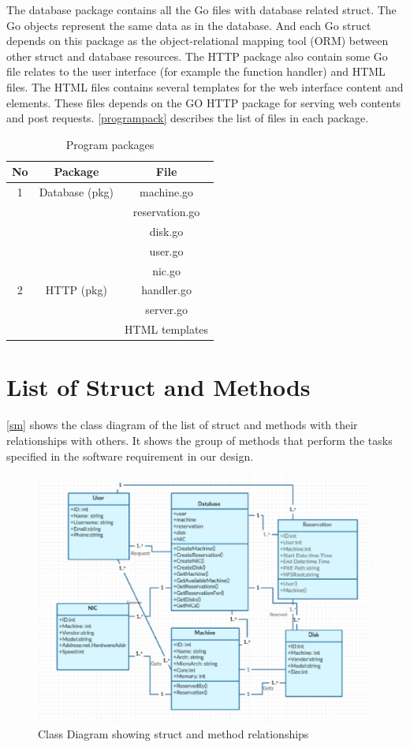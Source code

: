 The database package contains all the Go files with database related struct. The Go objects represent the same data as in the database. And each Go struct depends on this package as the object-relational mapping tool (ORM) between other struct and database resources. The HTTP package also contain some Go file relates to the user interface (for example the function handler) and HTML files. The HTML files contains several templates for the web interface content and elements. These files depends on the GO HTTP package for serving web contents and post requests. \autoref{programpack} describes the list of files in each package.
\pagebreak
\begin{table}[h!]
  \centering
  \begin{tabular}{ccc}
    \hline
    No & Package & File\\
   \hline
    1 &Database (pkg)& machine.go\\
       &&reservation.go\\
      &&disk.go\\
      &&user.go\\
      &&nic.go\\
    \hline
    2 &HTTP (pkg)& handler.go\\
    &&server.go\\
    &&HTML templates\\
    \hline
  \end{tabular}
  \caption{Program packages}
  \label{programpack}
\end{table}

\section{List of Struct and Methods}
\autoref{sm} shows the class diagram of the list of struct and methods with their relationships with others. It shows the group of methods that perform the tasks specified in the software requirement in our design.
\begin{figure}[h!]
\includegraphics[width = \linewidth]{methods.eps}
\caption{Class Diagram showing struct and method relationships}
\label{sm} 
\end{figure}
\pagebreak
